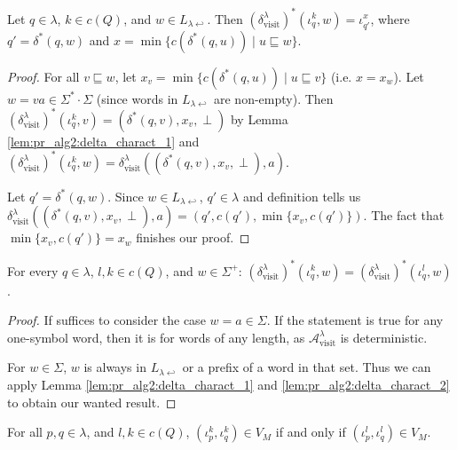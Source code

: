 \begin{lem}
	Let $q \in \lambda$, $k \in c(Q)$, and $w \in L_{\lambda \hookleftarrow}$. Then $(\delta^\lambda_\text{visit})^*(\iota_q^k, w) = \iota_{q'}^x$, where $q' = \delta^*(q, w)$ and $x = \min \{c(\delta^*(q, u)) \mid u \sqsubseteq w\}$.
	\label{lem:pr_alg2:delta_charact_2}
\end{lem}

\begin{proof}
	For all $v \sqsubseteq w$, let $x_v = \min \{c(\delta^*(q, u)) \mid u \sqsubseteq v\}$ (i.e. $x = x_w$). Let $w = va \in \Sigma^* \cdot \Sigma$ (since words in $L_{\lambda \hookleftarrow}$ are non-empty). Then $(\delta^\lambda_\text{visit})^*(\iota_q^k, v) = (\delta^*(q, v), x_v, \perp)$ by Lemma \ref{lem:pr_alg2:delta_charact_1} and $(\delta^\lambda_\text{visit})^*(\iota_q^k, w) = \delta^\lambda_\text{visit}((\delta^*(q, v), x_v, \perp), a)$.
	
	Let $q' = \delta^*(q, w)$. Since $w \in L_{\lambda \hookleftarrow}$, $q' \in \lambda$ and definition tells us $\delta^\lambda_\text{visit}((\delta^*(q, v), x_v, \perp), a) = (q', c(q'), \min \{x_v, c(q')\})$. The fact that $\min \{x_v, c(q')\} = x_w$ finishes our proof. 
\end{proof}


\begin{lem}
	For every $q \in \lambda$, $l, k \in c(Q)$, and $w \in \Sigma^+$: $(\delta^\lambda_\text{visit})^*(\iota_q^k, w) = (\delta^\lambda_\text{visit})^*(\iota_q^l, w)$.
	\label{lem:pr_alg2:iota_converge}
\end{lem}

\begin{proof} 
	If suffices to consider the case $w = a \in \Sigma$. If the statement is true for any one-symbol word, then it is for words of any length, as $\mathcal{A}_\text{visit}^\lambda$ is deterministic.
	
	For $w \in \Sigma$, $w$ is always in $L_{\lambda \hookleftarrow}$ or a prefix of a word in that set. Thus we can apply Lemma \ref{lem:pr_alg2:delta_charact_1} and \ref{lem:pr_alg2:delta_charact_2} to obtain our wanted result.
\end{proof}


\begin{lem}
	For all $p, q \in \lambda$, and $l, k \in c(Q)$, $(\iota_p^k, \iota_q^k) \in V_M$ if and only if $(\iota_p^l, \iota_q^l) \in V_M$.
	\label{lem:pr_alg2:iota_indexc_no_matter}
\end{lem}

